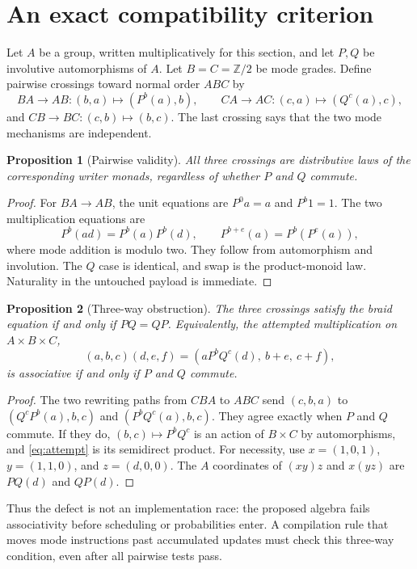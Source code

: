 \documentclass[11pt]{article}
\newtheorem{proposition}{Proposition}
\begin{document}
\section{An exact compatibility criterion}
Let $A$ be a group, written multiplicatively for this section, and let $P,Q$
be involutive automorphisms of $A$. Let $B=C=\mathbb Z/2$ be mode grades.
Define pairwise crossings toward normal order $ABC$ by
\[
 BA\longrightarrow AB:(b,a)\longmapsto(P^b(a),b),\qquad
 CA\longrightarrow AC:(c,a)\longmapsto(Q^c(a),c),
\]
and $CB\to BC:(c,b)\mapsto(b,c)$. The last crossing says that the two
mode mechanisms are independent.

\begin{proposition}[Pairwise validity]
All three crossings are distributive laws of the corresponding writer
monads, regardless of whether $P$ and $Q$ commute.
\end{proposition}
\begin{proof}
For $BA\to AB$, the unit equations are $P^0a=a$ and $P^b1=1$.
The two multiplication equations are
\[
 P^b(ad)=P^b(a)P^b(d),\qquad
 P^{b+e}(a)=P^b(P^e(a)),
\]
where mode addition is modulo two. They follow from automorphism and
involution. The $Q$ case is identical, and swap is the product-monoid law.
Naturality in the untouched payload is immediate.
\end{proof}

\begin{proposition}[Three-way obstruction]
The three crossings satisfy the braid equation if and only if $PQ=QP$.
Equivalently, the attempted multiplication on $A\times B\times C$,
\begin{equation}\label{eq:attempt}
 (a,b,c)(d,e,f)=(aP^bQ^c(d),\ b+e,\ c+f),
\end{equation}
is associative if and only if $P$ and $Q$ commute.
\end{proposition}
\begin{proof}
The two rewriting paths from $CBA$ to $ABC$ send $(c,b,a)$ to
$(Q^cP^b(a),b,c)$ and $(P^bQ^c(a),b,c)$. They agree exactly when
$P$ and $Q$ commute. If they do, $(b,c)\mapsto P^bQ^c$ is an action
of $B\times C$ by automorphisms, and \eqref{eq:attempt} is its semidirect
product. For necessity, use $x=(1,0,1)$, $y=(1,1,0)$, and $z=(d,0,0)$.
The $A$ coordinates of $(xy)z$ and $x(yz)$ are $PQ(d)$ and $QP(d)$.
\end{proof}

Thus the defect is not an implementation race: the proposed algebra fails
associativity before scheduling or probabilities enter. A compilation rule
that moves mode instructions past accumulated updates must check this
three-way condition, even after all pairwise tests pass.
\end{document}
